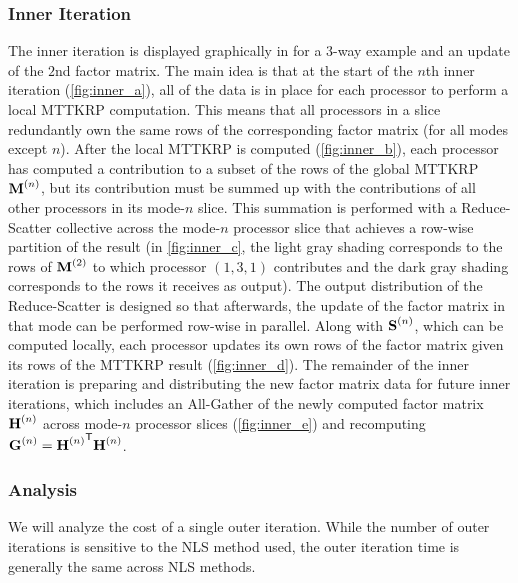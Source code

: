 \subsubsection{Inner Iteration}

The inner iteration is displayed graphically in  for a 3-way example and an update of the $2$nd factor matrix.
The main idea is that at the start of the $n$th inner iteration (\cref{fig:inner_a}), all of the data is in place for each processor to perform a local MTTKRP computation.
This means that all processors in a slice redundantly own the same rows of the corresponding factor matrix (for all modes except $n$).
After the local MTTKRP is computed (\cref{fig:inner_b}), each processor has computed a contribution to a subset of the rows of the global MTTKRP $\Mn{M}{n}$, but its contribution must be summed up with the contributions of all other processors in its mode-$n$ slice.
This summation is performed with a Reduce-Scatter collective across the mode-$n$ processor slice that achieves a row-wise partition of the result (in \cref{fig:inner_c}, the light gray shading corresponds to the rows of $\Mn{M}{2}$ to which processor $(1,3,1)$ contributes and the dark gray shading corresponds to the rows it receives as output).
The output distribution of the Reduce-Scatter is designed so that afterwards, the update of the factor matrix in that mode can be performed row-wise in parallel.
Along with $\Mn{S}{n}$, which can be computed locally, each processor updates its own rows of the factor matrix given its rows of the MTTKRP result (\cref{fig:inner_d}).
The remainder of the inner iteration is preparing and distributing the new factor matrix data for future inner iterations, which includes an All-Gather of the newly computed factor matrix $\Mn{H}{n}$ across mode-$n$ processor slices (\cref{fig:inner_e}) and recomputing $\Mn{G}{n}={\Mn{H}{n}}^\Tra\Mn{H}{n}$.

\subsubsection{Analysis}

We will analyze the cost of a single outer iteration.
While the number of outer iterations is sensitive to the NLS method used, the outer iteration time is generally the same across NLS methods.

